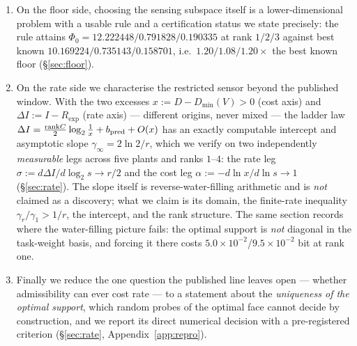 \begin{enumerate}
      matches the best previously known designs at ten of eleven anchors to within
      $1.4\%$ and reproduces the rank-deficiency of the numerically optimal designs
      through channel switch-on rates (\S\ref{sec:waterfill}).
\item On the floor side, choosing the sensing subspace itself is a
      lower-dimensional problem with a usable rule and a certification status we
      state precisely: the rule attains
      $\Phi_0=12.222448/0.791828/0.190335$ at rank $1/2/3$ against best known
      $10.169224/0.735143/0.158701$, i.e.\ $1.20/1.08/1.20\times$ the best known
      floor (\S\ref{sec:floor}).
\item On the rate side we characterise the restricted sensor beyond the published
      window. With the two excesses $x:=D-D_{\min}(V)>0$ (cost axis) and
      $\Delta I:=I-R_{\exp}$ (rate axis) --- different origins, never mixed --- the
      ladder law
      $\Delta I=\frac{\mathrm{rank}C}{2}\log_2\frac1x+b_{\rm pred}+O(x)$ has an
      exactly computable intercept and asymptotic slope
      $\gamma_\infty=2\ln2/r$, which we verify on two independently
      \emph{measurable} legs across five plants and ranks $1$--$4$: the rate leg
      $\sigma:=d\Delta I/d\log_2s\to r/2$ and the cost leg
      $\alpha:=-d\ln x/d\ln s\to1$ (\S\ref{sec:rate}). The slope itself is
      reverse-water-filling arithmetic and is \emph{not} claimed as a discovery;
      what we claim is its domain, the finite-rate inequality
      $\gamma_r/\gamma_1>1/r$, the intercept, and the rank structure.
      The same section records where the water-filling picture fails: the optimal
      support is \emph{not} diagonal in the task-weight basis, and forcing it
      there costs $5.0\times10^{-2}$/$9.5\times10^{-2}$ bit at rank one.
\item Finally we reduce the one question the published line leaves open ---
      whether admissibility can ever cost rate --- to a statement about the
      \emph{uniqueness of the optimal support}, which random probes of the
      optimal face cannot decide by construction, and we report its direct
      numerical decision with a pre-registered criterion
      (\S\ref{sec:rate}, Appendix~\ref{app:repro}).
\end{enumerate}


